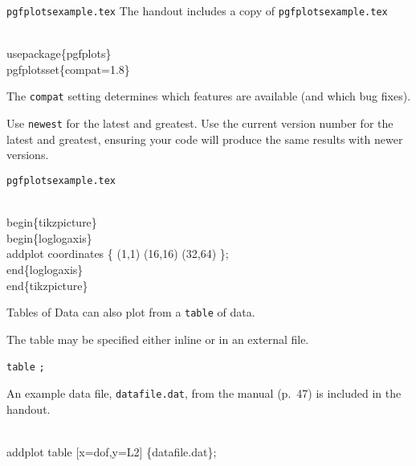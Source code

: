 \begin{frame}[fragile]{\texttt{pgfplotsexample.tex}}
  The handout includes a copy of \texttt{pgfplotsexample.tex}
  \begin{semiverbatim}
    \\usepackage\{pgfplots\}
    \\pgfplotsset\{compat=1.8\}
  \end{semiverbatim}
  The \verb|compat| setting determines which features are available (and which bug fixes).

  Use \verb|newest| for the latest and greatest.
%
  Use the current version number for the latest and greatest, ensuring your code will produce the same results with newer versions.
\end{frame}



\begin{frame}[fragile]{\texttt{pgfplotsexample.tex}}
  \begin{semiverbatim}
    \alert<2>{\\begin\{tikzpicture\}}
      \alert<3>{\\begin\{loglogaxis\}}
        \alert<4>{\\addplot} \alert<5>{coordinates} \alert<6>{\{
          (1,1)
          (16,16)
          (32,64)
        \}}\alert<7>{;}
      \alert<3>{\\end\{loglogaxis\}}
    \alert<2>{\\end\{tikzpicture\}}
  \end{semiverbatim}
\end{frame}

\begin{frame}[fragile]{Tables of Data}
  \pgfplots{} can also plot from a \verb|table| of data.

  The table may be specified either inline or in an external file.

   \alert<2,6>{\texttt{table}} \alert<3,7-9>{} \alert<4,10>{}\texttt{;}

  An example data file, \alert<10>{\texttt{datafile.dat}}, from the manual (p.~47) is included in the handout.

  \begin{semiverbatim}
    \\addplot \alert<6>{table} \alert<7>{[}\alert<7,8>{x=dof}\alert<7>{,}\alert<7,9>{y=L2}\alert<7>{]} \alert<10>{\{datafile.dat\}};
  \end{semiverbatim}

\end{frame}

